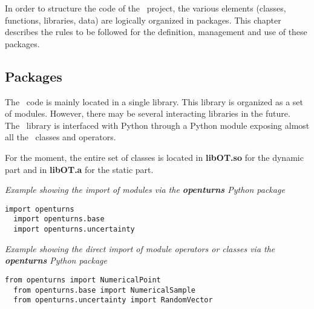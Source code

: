 
In order to structure the code of the \OT\ project, the various elements (classes, functions, libraries, data) are logically organized in packages. This chapter describes the rules to be followed for the definition, management and use of these packages.

\subsection{Packages}
The \OT\ code is mainly located in a single library. This library is organized as a set of modules. However, there may be several interacting libraries in the future.\\
The \OT\ library is interfaced with Python through a Python module exposing almost all the \OT\ classes and operators.

For the moment, the entire set of classes is located in {\bf libOT.so} for the dynamic part and in {\bf libOT.a} for the static part.

\emph{Example showing the import of modules via the {\bf openturns} Python package}
\lstset{language=C++, basicstyle=\normalsize}
\begin{lstlisting}[frame=TRBL]
  import openturns
  import openturns.base
  import openturns.uncertainty
\end{lstlisting}

\emph{Example showing the direct import of module operators or classes via the {\bf openturns} Python package}
\lstset{language=C++, basicstyle=\normalsize}
\begin{lstlisting}[frame=TRBL]
  from openturns import NumericalPoint
  from openturns.base import NumericalSample
  from openturns.uncertainty import RandomVector
\end{lstlisting}
